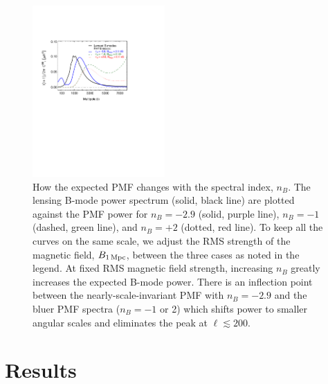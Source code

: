 \documentclass[apj]{emulateapj}
\newcommand{\bpmf}{\ensuremath{B_{\rm 1\,Mpc}}}
\begin{document}
\begin{figure}[htb]\centering
\includegraphics[width=0.45\textwidth,clip,trim={1.5cm 12.cm 5.5cm 4cm}]{pmf_templates_nb.pdf}
  \caption[CMB polarization from PMFs with different spectral indices]{ \label{fig:pmf-nb}
  How the expected PMF changes with the spectral index, $n_B$. 
  The lensing B-mode power spectrum (solid, black line) are plotted against the PMF power for $n_B=-2.9$ (solid, purple line), $n_B=-1$ (dashed, green line), and $n_B=+2$ (dotted, red line). 
  To keep all the curves on the same scale, we adjust the RMS strength of the magnetic field, \bpmf{}, between the three cases as noted in the legend. 
  At fixed RMS magnetic field strength, increasing $n_B$ greatly increases the expected B-mode power. 
  There is an inflection point between the nearly-scale-invariant PMF with $n_B=-2.9$ and the bluer PMF spectra ($n_B=-1$ or 2) which shifts power to smaller angular scales and eliminates the peak at $\ell \lesssim 200$. 
  }
\end{figure}
 
\section{Results}
\label{sec:results}
\end{document}
